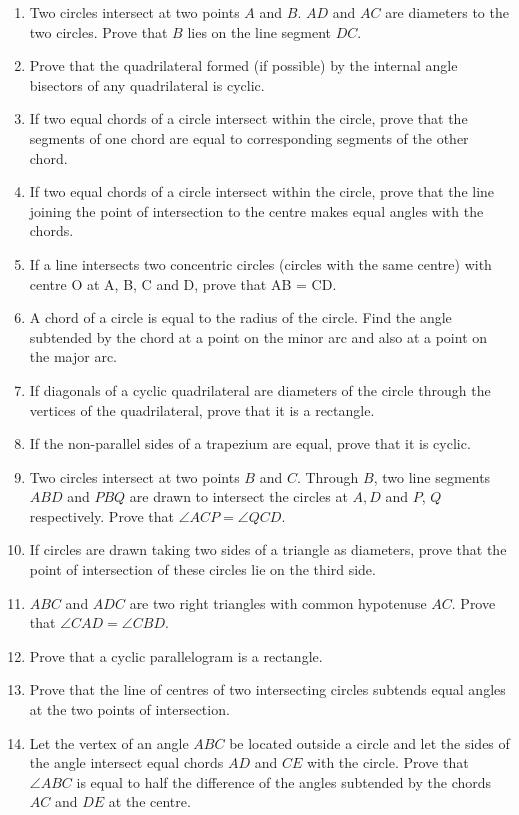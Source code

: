 \begin{enumerate}[label=\arabic*.,ref=\thesubsection.\theenumi]
\item Two circles intersect at two points $A$ and $B$. $AD$ and $AC$ are diameters to the two circles. Prove that $B$ lies on the line segment $DC$.
\item Prove that the quadrilateral formed (if possible) by the internal angle bisectors of any quadrilateral is cyclic.
\item  If two equal chords of a circle intersect within the circle, prove that the segments of one chord are equal to corresponding segments of the other chord.
\item If two equal chords of a circle intersect within the circle, prove that the line joining the point of intersection to the centre makes equal angles with the chords.
\item If a line intersects two concentric circles (circles with the same centre) with centre O at A, B, C and D, prove that AB = CD.
\item A chord of a circle is equal to the radius of the
circle. Find the angle subtended by the chord at
a point on the minor arc and also at a point on the
major arc.
\item If diagonals of a cyclic quadrilateral are diameters of the circle through the vertices of
the quadrilateral, prove that it is a rectangle.
\item If the non-parallel sides of a trapezium are equal, prove that it is cyclic.
\item Two circles intersect at two points $B$ and $C$.
Through $B$, two line segments $ABD$ and $PBQ$
are drawn to intersect the circles at $A, D$ and $P$,
$Q$ respectively. Prove that
$\angle ACP = \angle QCD$.
\item If circles are drawn taking two sides of a triangle as diameters, prove that the point of
intersection of these circles lie on the third side.
\item $ABC$ and $ADC$ are two right triangles with common hypotenuse $AC$. Prove that
$\angle CAD = \angle CBD$.
\item Prove that a cyclic parallelogram is a rectangle.
\item Prove that the line of centres of two intersecting circles subtends equal angles at the
two points of intersection.
\item Let the vertex of an angle $ABC$ be located outside a circle and let the sides of the angle
intersect equal chords $AD$ and $CE$ with the circle. Prove that $\angle ABC$ is equal to half the
difference of the angles subtended by the chords $AC$ and $DE$ at the centre.

\end{enumerate}
